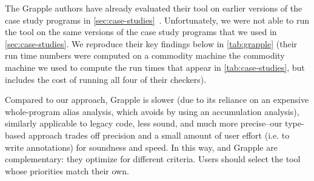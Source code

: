 The Grapple authors have already evaluated their tool on earlier
versions of the case study programs in
\cref{sec:case-studies}~\cite{zuo2019grapple}.  Unfortunately, we were
not able to run the tool on the same versions of the case study
programs that we used in \cref{sec:case-studies}.
We reproduce their key findings below in \cref{tab:grapple}
(their run time numbers were computed on a commodity machine
 the commodity machine we used to compute the run
times that appear in \cref{tab:case-studies}, but includes the cost
of running all four of their checkers).

Compared to our approach, Grapple is slower (due to its reliance on
an expensive whole-program alias analysis, which \tool avoids by using
an accumulation analysis), similarly applicable to legacy
code, less sound, and much more precise--our type-based approach
trades off precision and a small amount of user effort (i.e. to write annotations)
for soundness and speed. In this way, \tool and Grapple are complementary:
they optimize for different criteria. Users should select the tool whose
priorities match their own.
